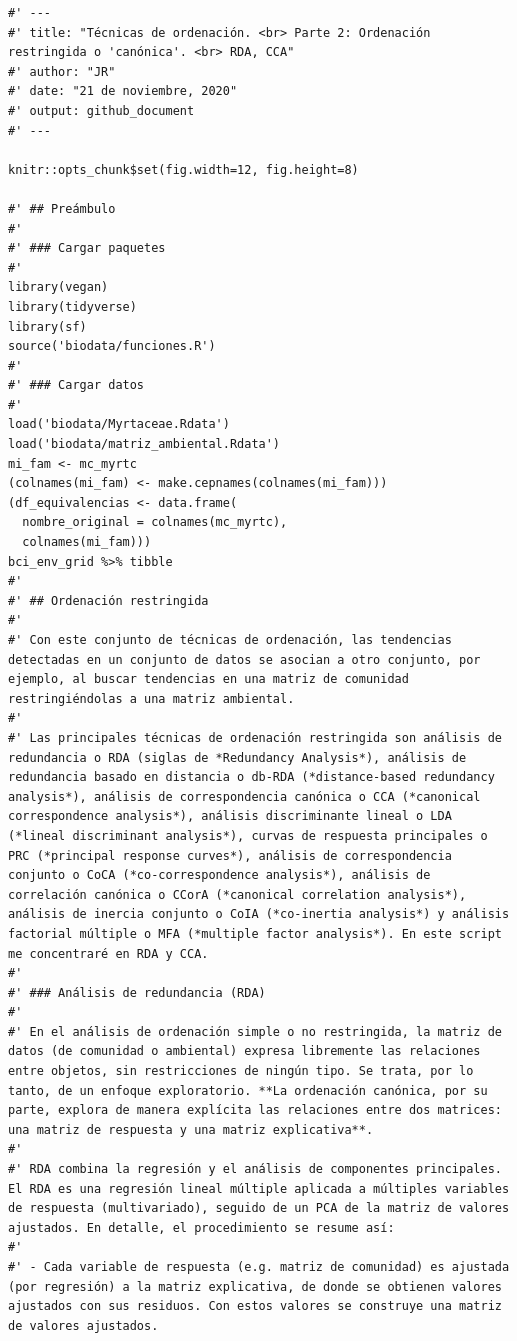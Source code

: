 \documentclass[11pt,]{article}
\begin{document}
\begin{verbatim}
#' ---
#' title: "Técnicas de ordenación. <br> Parte 2: Ordenación restringida o 'canónica'. <br> RDA, CCA"
#' author: "JR"
#' date: "21 de noviembre, 2020"
#' output: github_document
#' ---

knitr::opts_chunk$set(fig.width=12, fig.height=8)

#' ## Preámbulo
#' 
#' ### Cargar paquetes
#' 
library(vegan)
library(tidyverse)
library(sf)
source('biodata/funciones.R')
#' 
#' ### Cargar datos
#' 
load('biodata/Myrtaceae.Rdata')
load('biodata/matriz_ambiental.Rdata')
mi_fam <- mc_myrtc
(colnames(mi_fam) <- make.cepnames(colnames(mi_fam)))
(df_equivalencias <- data.frame(
  nombre_original = colnames(mc_myrtc),
  colnames(mi_fam)))
bci_env_grid %>% tibble
#' 
#' ## Ordenación restringida
#' 
#' Con este conjunto de técnicas de ordenación, las tendencias detectadas en un conjunto de datos se asocian a otro conjunto, por ejemplo, al buscar tendencias en una matriz de comunidad  restringiéndolas a una matriz ambiental.
#' 
#' Las principales técnicas de ordenación restringida son análisis de redundancia o RDA (siglas de *Redundancy Analysis*), análisis de redundancia basado en distancia o db-RDA (*distance-based redundancy analysis*), análisis de correspondencia canónica o CCA (*canonical correspondence analysis*), análisis discriminante lineal o LDA (*lineal discriminant analysis*), curvas de respuesta principales o PRC (*principal response curves*), análisis de correspondencia conjunto o CoCA (*co-correspondence analysis*), análisis de correlación canónica o CCorA (*canonical correlation analysis*), análisis de inercia conjunto o CoIA (*co-inertia analysis*) y análisis factorial múltiple o MFA (*multiple factor analysis*). En este script me concentraré en RDA y CCA.
#' 
#' ### Análisis de redundancia (RDA)
#' 
#' En el análisis de ordenación simple o no restringida, la matriz de datos (de comunidad o ambiental) expresa libremente las relaciones entre objetos, sin restricciones de ningún tipo. Se trata, por lo tanto, de un enfoque exploratorio. **La ordenación canónica, por su parte, explora de manera explícita las relaciones entre dos matrices: una matriz de respuesta y una matriz explicativa**.
#' 
#' RDA combina la regresión y el análisis de componentes principales. El RDA es una regresión lineal múltiple aplicada a múltiples variables de respuesta (multivariado), seguido de un PCA de la matriz de valores ajustados. En detalle, el procedimiento se resume así:
#' 
#' - Cada variable de respuesta (e.g. matriz de comunidad) es ajustada (por regresión) a la matriz explicativa, de donde se obtienen valores ajustados con sus residuos. Con estos valores se construye una matriz de valores ajustados.

\end{verbatim}
\end{document}
